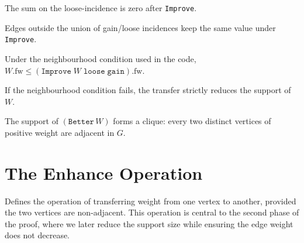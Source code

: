\begin{lemma}
    \label{lem:Improve_loose_contribution_zero}
    The sum on the loose-incidence is zero after \texttt{Improve}.
\end{lemma}

\begin{lemma}
    \label{lem:Improve_unchanged_edge_sum}
    Edges outside the union of gain/loose incidences keep the same value under \texttt{Improve}.
\end{lemma}

\begin{lemma}
    \label{lem:Improve_total_weight_nondec}
Under the neighbourhood condition used in the code, $W.\mathrm{fw}\le (\texttt{Improve}\;W\;\texttt{loose}\;\texttt{gain}).\mathrm{fw}$.
\end{lemma}

\begin{lemma}
    \label{lem:Improve_support_strictly_reduced}
If the neighbourhood condition fails, the transfer strictly reduces the support of $W$.
\end{lemma}

\begin{theorem}
    \label{thm:Better_forms_clique}
The support of $(\texttt{Better}\,W)$ forms a clique: every two distinct vertices of positive weight are adjacent in $G$.
\end{theorem}


\section{The Enhance Operation}

\begin{definition}[Enhance]
  \label{def:Enhance}
  \leanok
  Defines the operation of transferring weight from one vertex to another,
  provided the two vertices are non-adjacent. This operation is central to the
  second phase of the proof, where we later reduce the support size while ensuring
  the edge weight does not decrease.
\end{definition}

